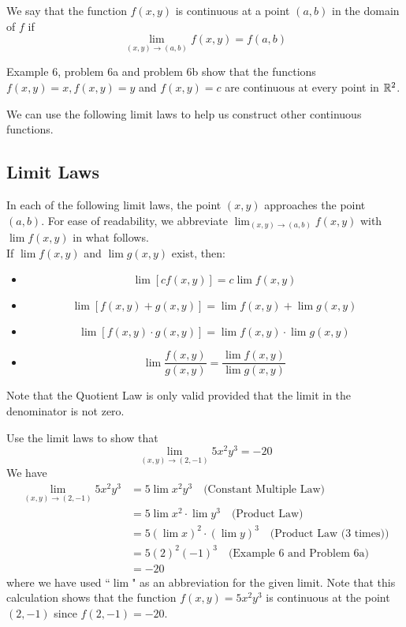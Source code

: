 \documentclass[handout]{ximera}
\begin{document}
\begin{definition}[Continuity]
We say that the function $f(x,y)$ is continuous at a point $(a,b)$ in the domain of $f$ if
\[
\lim_{(x,y) \to (a,b)} f(x,y) = f(a,b)
\]
\end{definition}

Example 6, problem 6a and problem 6b show that 
the functions $f(x,y) = x, f(x,y) = y$ and $f(x,y) = c$ are 
continuous at every point in $\mathbb R^2$.

We can use the following limit laws to help us 
construct other continuous functions.

\subsection{Limit Laws}
In each of the following limit laws, 
the point $(x,y)$ approaches the point $(a,b)$. 
For ease of readability, 
we abbreviate $\lim_{(x,y) \to (a,b)} f(x,y)$ 
with $\lim f(x,y)$ in what follows.\\
If $\lim f(x,y)$ and $\lim g(x,y)$ exist, then:\\
\begin{itemize}
\item[Constant Multiple Law] 
\[
 \lim[cf(x,y) ] = c\lim f(x,y) 
\]
\item[Sum Law]
\[
 \lim [f(x,y) + g(x,y)] = \lim f(x,y) +\lim g(x,y) 
\]
\item[Product Law]
\[
\lim[f(x,y) \cdot g(x,y)] = \lim f(x,y) \cdot \lim g(x,y)
\]
\item[Quotient Law]
\[
\lim \frac{f(x,y)}{g(x,y)} = \frac{\lim f(x,y)}{\lim g(x,y)} 
\]  
\end{itemize}
Note that the Quotient Law is only valid provided that the limit 
in the denominator is not zero.


\begin{example}[Example 7]
Use the limit laws to show that 
\[
\lim_{(x,y) \to (2,-1)} 5x^2y^3 = -20
\]
We have
\begin{align*}
\lim_{(x,y) \to (2,-1)} 5x^2y^3 &= 5\lim x^2y^3 \quad \text{(Constant Multiple Law)}\\
  &= 5 \lim x^2 \cdot \lim y^3  \quad \text{(Product Law)}\\
  &= 5 \left(\lim x\right)^2 \cdot \left(\lim y\right)^3  \quad \text{(Product Law (3 times))}\\
  &= 5(2)^2(-1)^3 \quad \text{(Example 6 and Problem 6a)}\\
  &= -20
\end{align*}
where we have used ``$\lim$" as an abbreviation for the given limit.
Note that this calculation shows that the function $f(x,y) = 5x^2y^3$ is continuous 
at the point $(2, -1)$ since $f(2, -1) = -20$.
\end{example}
\end{document}
